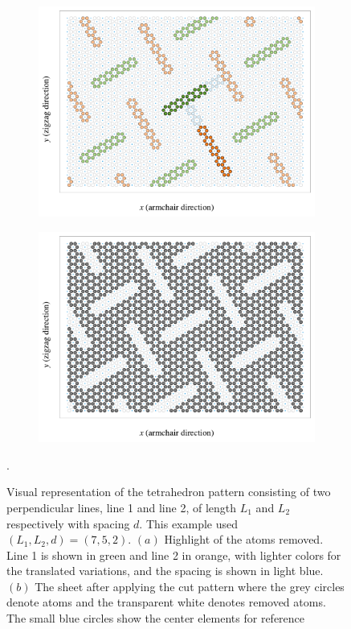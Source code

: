 \begin{figure}[H]
  \centering
  \begin{subfigure}[t]{0.48\textwidth}
      \centering
      \includegraphics[width=\textwidth]{figures/system/pop_up_inverse.pdf}
      \caption{}
      \label{fig:pop_up_a}
    \end{subfigure}
    \hfill
    \begin{subfigure}[t]{0.48\textwidth}
      \centering
      \includegraphics[width=\textwidth]{figures/system/pop_up_pattern.pdf}
      \caption{}
      \label{fig:pop_up_b}
  \end{subfigure}
  \hfill
     \caption{Visual representation of the tetrahedron pattern consisting of two perpendicular lines, line 1 and line 2, of length $L_1$ and $L_2$ respectively with spacing $d$. This example used $(L_1, L_2, d) = (7, 5, 2)$. $(a)$ Highlight of the atoms removed. Line 1 is shown in green and line 2 in orange, with lighter colors for the translated variations, and the spacing is shown in light blue. $(b)$ The sheet after applying the cut pattern where the grey circles denote atoms and the transparent white denotes removed atoms. The small blue circles show the center elements for reference}.
     \label{fig:pop_up}
\end{figure}

